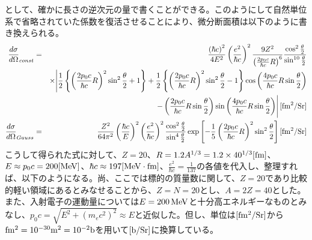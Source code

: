 \documentclass[a4j,fleqn]{jsarticle}
\begin{document}
        として、確かに長さの逆次元の量で書くことができる。このようにして自然単位系で省略されていた係数を復活させることにより、微分断面積は以下のように書き換えられる。
        \begin{eqnarray}
            \frac{d\sigma}{d\Omega}_{const}=&&\frac{\left(\hbar{c}\right)^2}{4E^2}\left(\frac{e^2}{\hbar{c}}\right)^2\frac{9Z^2}{\left(\frac{2p_0c}{\hbar{c}}R\right)^6}\frac{\cos^2{\frac{\theta}{2}}}{\sin^{10}{\frac{\theta}{2}}}\\
            \nonumber&&\times\Bigg|\frac{1}{2}\left\{\left(\frac{2p_0c}{\hbar{c}}R\right)^2\sin^2{\frac{\theta}{2}}+1\right\}+\frac{1}{2}\left\{\left(\frac{2p_0c}{\hbar{c}}R\right)^2\sin^2{\frac{\theta}{2}}-1\right\}\cos{\left(\frac{4p_0c}{\hbar{c}}R\sin{\frac{\theta}{2}}\right)}\\\nonumber&&-\left(\frac{2p_0c}{\hbar{c}}R\sin{\frac{\theta}{2}}\right)\sin{\left(\frac{4p_0c}{\hbar{c}}R\sin{\frac{\theta}{2}}\right)}\Bigg|\,{\rm[fm^2/Sr]}\\
            \frac{d\sigma}{d\Omega}_{Gauss}=&&\frac{Z^2}{64\pi^2}\left(\frac{\hbar{c}}{E}\right)^2\left(\frac{e^2}{\hbar{c}}\right)^2\frac{\cos^2{\frac{\theta}{2}}}{\sin^4{\frac{\theta}{2}}}\exp{\left[-\frac{1}{5}\left(\frac{2p_0c}{\hbar{c}}R\right)^2\sin^2{\frac{\theta}{2}}\right]}\,{\rm[fm^2/Sr]}
        \end{eqnarray}
        こうして得られた式に対して、$Z=20$、$R=1.2A^{1/3}=1.2\times40^{1/3}{\rm[fm]}$、$E\approx{p_0c}=200{\rm[MeV]}$、$\hbar{c}\approx197{\rm[MeV\cdot{fm}]}$、$\frac{e^2}{\hbar{c}}=\frac{1}{137}$の各値を代入し、整理すれば、以下のようになる。尚、ここでは標的の質量数に関して、$Z=20$であり比較的軽い領域にあるとみなせることから、$Z=N=20$とし、$A=2Z=40$とした。また、入射電子の運動量については$E=200\,{\rm{MeV}}$と十分高エネルギーなものとみなし、$p_0c=\sqrt{E^2+\left(m_ec^2\right)^2}\approx{E}$と近似した。但し、単位は${\rm[fm^2/Sr]}$から${\rm{fm^2=10^{-30}m^2=10^{-2}b}}$を用いて${\rm[b/Sr]}$に換算している。
\end{document}
